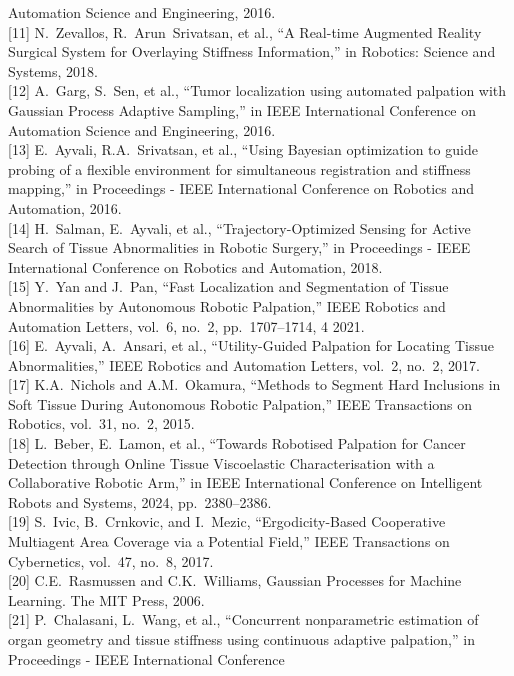 \documentclass[11pt]{article}
\begin{document}
\begin{footnotesize}
Automation Science and Engineering, 2016.\\[2pt]
[11] N.~Zevallos, R.~Arun~Srivatsan, et al., ``A Real-time Augmented
Reality Surgical System for Overlaying Stiffness Information,'' in
Robotics: Science and Systems, 2018.\\[2pt]
[12] A.~Garg, S.~Sen, et al., ``Tumor localization using automated
palpation with Gaussian Process Adaptive Sampling,'' in IEEE
International Conference on Automation Science and Engineering,
2016.\\[2pt]
[13] E.~Ayvali, R.A.~Srivatsan, et al., ``Using Bayesian optimization
to guide probing of a flexible environment for simultaneous
registration and stiffness mapping,'' in Proceedings - IEEE
International Conference on Robotics and Automation, 2016.\\[2pt]
[14] H.~Salman, E.~Ayvali, et al., ``Trajectory-Optimized Sensing for
Active Search of Tissue Abnormalities in Robotic Surgery,'' in
Proceedings - IEEE International Conference on Robotics and
Automation, 2018.\\[2pt]
[15] Y.~Yan and J.~Pan, ``Fast Localization and Segmentation of
Tissue Abnormalities by Autonomous Robotic Palpation,'' IEEE
Robotics and Automation Letters, vol.~6, no.~2, pp.~1707--1714,
4 2021.\\[2pt]
[16] E.~Ayvali, A.~Ansari, et al., ``Utility-Guided Palpation for
Locating Tissue Abnormalities,'' IEEE Robotics and Automation
Letters, vol.~2, no.~2, 2017.\\[2pt]
[17] K.A.~Nichols and A.M.~Okamura, ``Methods to Segment Hard
Inclusions in Soft Tissue During Autonomous Robotic Palpation,''
IEEE Transactions on Robotics, vol.~31, no.~2, 2015.\\[2pt]
[18] L.~Beber, E.~Lamon, et al., ``Towards Robotised Palpation for
Cancer Detection through Online Tissue Viscoelastic Characterisation
with a Collaborative Robotic Arm,'' in IEEE International Conference
on Intelligent Robots and Systems, 2024, pp.~2380--2386.\\[2pt]
[19] S.~Ivic, B.~Crnkovic, and I.~Mezic, ``Ergodicity-Based
Cooperative Multiagent Area Coverage via a Potential Field,'' IEEE
Transactions on Cybernetics, vol.~47, no.~8, 2017.\\[2pt]
[20] C.E.~Rasmussen and C.K.~Williams, Gaussian Processes for
Machine Learning. The MIT Press, 2006.\\[2pt]
[21] P.~Chalasani, L.~Wang, et al., ``Concurrent nonparametric
estimation of organ geometry and tissue stiffness using continuous
adaptive palpation,'' in Proceedings - IEEE International Conference

\end{footnotesize}
\end{document}
